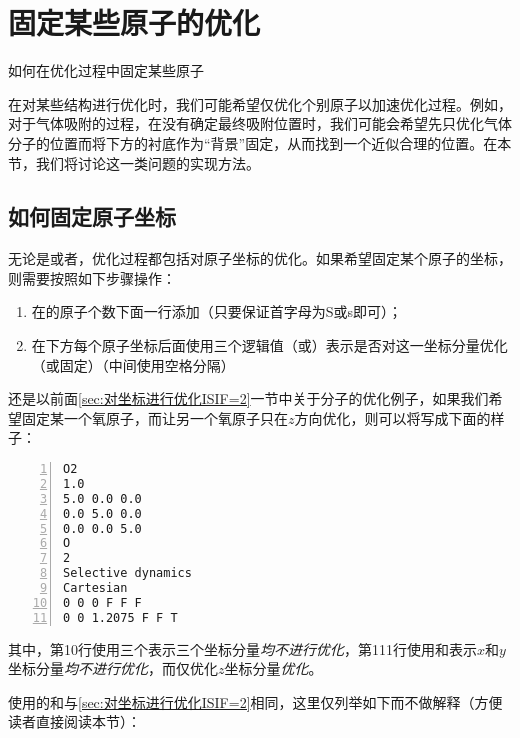 \section{固定某些原子的优化}\label{sec:固定某些原子的优化}

\begin{Abstract}
    \item 如何在优化过程中固定某些原子
\end{Abstract}

在对某些结构进行优化时，我们可能希望仅优化个别原子以加速优化过程。例如，对于气体吸附的过程，在没有确定最终吸附位置时，我们可能会希望先只优化气体分子的位置而将下方的衬底作为“背景”固定，从而找到一个近似合理的位置。在本节，我们将讨论这一类问题的实现方法。

\subsection{如何固定原子坐标}\label{subsec:固定某些原子的优化-如何固定原子坐标}

无论是或者，优化过程都包括对原子坐标的优化。如果希望固定某个原子的坐标，则需要按照如下步骤操作：

\begin{enumerate}
    \item 在的原子个数下面一行添加（只要保证首字母为S或s即可）；
    \item 在下方每个原子坐标后面使用三个逻辑值（或）表示是否对这一坐标分量优化（或固定）（中间使用空格分隔）
\end{enumerate}

还是以前面\ref{sec:对坐标进行优化ISIF=2}一节中关于分子的优化例子，如果我们希望固定某一个氧原子，而让另一个氧原子只在$z$方向优化，则可以将写成下面的样子：

\begin{lstlisting}[caption=POSCAR,numbers=left]
O2
1.0
5.0 0.0 0.0
0.0 5.0 0.0
0.0 0.0 5.0
O
2
Selective dynamics
Cartesian
0 0 0 F F F
0 0 1.2075 F F T
\end{lstlisting}

其中，第10行使用三个表示三个坐标分量\emph{均不进行优化}，第111行使用和表示$x$和$y$坐标分量\emph{均不进行优化}，而仅优化$z$坐标分量\emph{优化}。

使用的和与\ref{sec:对坐标进行优化ISIF=2}相同，这里仅列举如下而不做解释（方便读者直接阅读本节）：

